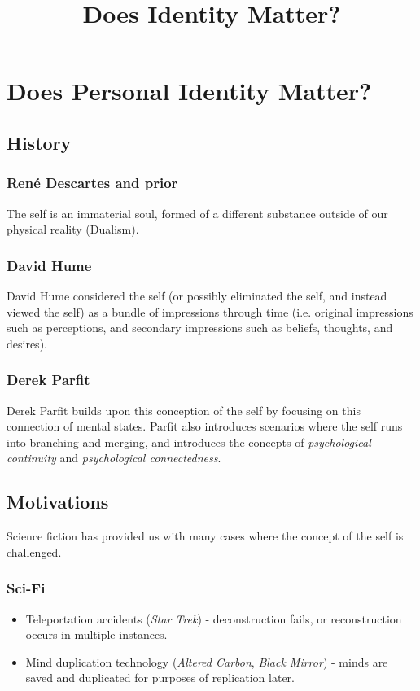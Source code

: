 \documentclass[11pt]{article}
\date{}
\title{Does Identity Matter?}
\begin{document}
\section{Does Personal Identity Matter?}
\label{sec:org1a2301a}
\subsection{History}
\label{sec:orgff30f97}
\subsubsection*{René Descartes and prior}
\label{sec:org6cd0abb}
The self is an immaterial soul, formed of a different substance outside of our physical reality (Dualism).

\subsubsection*{David Hume}
\label{sec:org2e5350b}
David Hume considered the self (or possibly eliminated the self, and instead viewed the self) as a bundle of impressions through time (i.e. original impressions such as perceptions, and secondary impressions such as beliefs, thoughts, and desires).

\subsubsection*{Derek Parfit}
\label{sec:org9da1726}
Derek Parfit builds upon this conception of the self by focusing on this connection of mental states.
Parfit also introduces scenarios where the self runs into branching and merging, and introduces the concepts of \emph{psychological continuity} and \emph{psychological connectedness}.

\subsection{Motivations}
\label{sec:org69dd6c5}
Science fiction has provided us with many cases where the concept of the self is challenged.

\subsubsection*{Sci-Fi}
\label{sec:org57d7100}
\begin{itemize}
\item Teleportation accidents (\emph{Star Trek}) -
\label{sec:orgefd4355}
deconstruction fails, or reconstruction occurs in multiple instances.

\item Mind duplication technology (\emph{Altered Carbon}, \emph{Black Mirror}) -
\label{sec:orgbefe28e}
minds are saved and duplicated for purposes of replication later.
\end{itemize}
\end{document}
